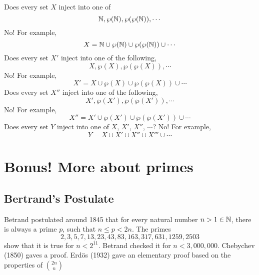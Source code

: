 \documentclass{article}
\begin{document}
\begin{question}
    Does every set $X$ inject into one of
    \[
        \mathbb{N}, \wp(\mathbb{N}), \wp(\wp(\mathbb{N})), \cdots
    \]
    No! For example,
    \[
        X = \mathbb{N} \cup \wp(\mathbb{N}) \cup \wp(\wp(\mathbb{N})) \cup \cdots
    \]
    Does every set $X'$ inject into one of the following,
    \[
        X, \wp(X), \wp(\wp(X)), \cdots  
    \]
    No! For example,
    \[
        X' = X \cup \wp(X) \cup \wp(\wp(X)) \cup \cdots 
    \]
    Does every set $X''$ inject into one of the following,
    \[
        X', \wp(X'), \wp(\wp(X')), \cdots  
    \]
    No! For example,
    \[
        X'' = X' \cup \wp(X') \cup \wp(\wp(X')) \cup \cdots 
    \]
    Does every set $Y$ inject into one of $X$, $X'$, $X''$, $\cdots$?
    No! For example,
    \[
        Y = X \cup X' \cup X'' \cup X''' \cup \cdots
    \]
\end{question}

\section{Bonus! More about primes}
\subsection{Bertrand's Postulate}
Betrand postulated around 1845 that for every natural number $n > 1 \in \mathbb{N}$,
there is always a prime $p$, such that $n \leq p < 2n$.
The primes
\[
    2, 3, 5, 7, 13, 23, 43, 83, 163, 317, 631, 1259, 2503
\]
show that it is true for $n < 2^{11}$.
Betrand checked it for $n < 3,000,000$.
Chebychev (1850) gaves a proof.
Erd\"os (1932) gave an elementary proof based on the properties of $\binom{2n}{n}$
\end{document}
